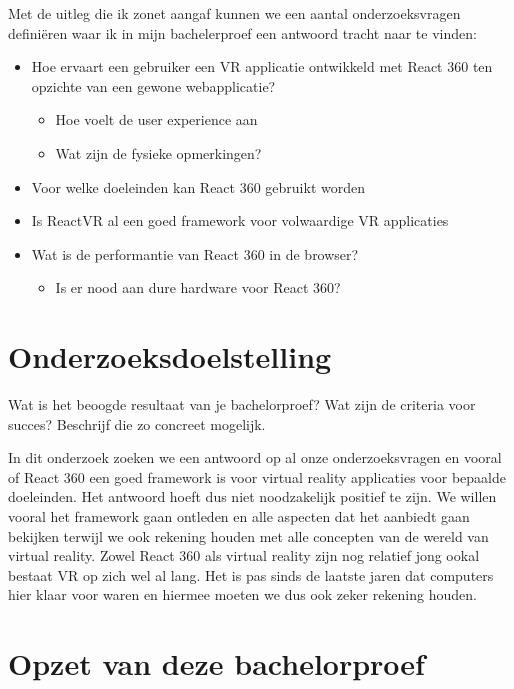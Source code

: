 Met de uitleg die ik zonet aangaf kunnen we een aantal onderzoeksvragen definiëren waar ik in mijn bachelerproef een antwoord tracht naar te vinden:
\begin{itemize}
  \item	Hoe ervaart een gebruiker een VR applicatie ontwikkeld met React 360 ten opzichte van een gewone webapplicatie?
  \begin{itemize}
  \item	Hoe voelt de user experience aan
  \item	Wat zijn de fysieke opmerkingen?
  \end{itemize}
  \item	Voor welke doeleinden kan React 360 gebruikt worden
  \item	Is ReactVR al een goed framework voor volwaardige VR applicaties
  \item	Wat is de performantie van React 360 in de browser?
  \begin{itemize}
  \item Is er nood aan dure hardware voor React 360?
  \end{itemize}
\end{itemize}



\section{Onderzoeksdoelstelling}
\label{sec:onderzoeksdoelstelling}

Wat is het beoogde resultaat van je bachelorproef? Wat zijn de criteria voor succes? Beschrijf die zo concreet mogelijk.

In dit onderzoek zoeken we een antwoord op al onze onderzoeksvragen en vooral of React 360 een goed framework is voor virtual reality applicaties voor bepaalde doeleinden. Het antwoord hoeft dus niet noodzakelijk positief te zijn. We willen vooral het framework gaan ontleden en alle aspecten dat het aanbiedt gaan bekijken terwijl we ook rekening houden met alle concepten van de wereld van virtual reality. Zowel React 360 als virtual reality zijn nog relatief jong ookal bestaat VR op zich wel al lang. Het is pas sinds de laatste jaren dat computers hier klaar voor waren en hiermee moeten we dus ook zeker rekening houden.

\section{Opzet van deze bachelorproef}
\label{sec:opzet-bachelorproef}

